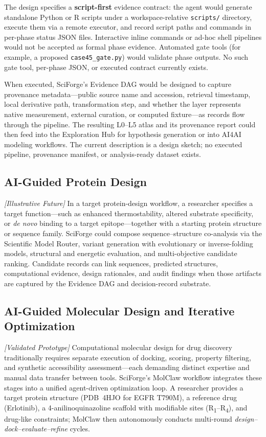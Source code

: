\documentclass[sn-basic,Numbered,pdflatex]{sn-jnl}
\begin{document}
The design specifies a \textbf{script-first} evidence contract: the agent would generate standalone Python or R scripts under a workspace-relative \texttt{scripts/} directory, execute them via a remote executor, and record script paths and commands in per-phase status JSON files. Interactive inline commands or ad-hoc shell pipelines would not be accepted as formal phase evidence. Automated gate tools (for example, a proposed \texttt{case45\_gate.py}) would validate phase outputs. No such gate tool, per-phase JSON, or executed contract currently exists.

When executed, SciForge's Evidence DAG would be designed to capture provenance metadata---public source name and accession, retrieval timestamp, local derivative path, transformation step, and whether the layer represents native measurement, external curation, or computed fixture---as records flow through the pipeline. The resulting L0--L5 atlas and its provenance report could then feed into the Exploration Hub for hypothesis generation or into AI4AI modeling workflows. The current description is a design sketch; no executed pipeline, provenance manifest, or analysis-ready dataset exists.

\FloatBarrier
\subsection{AI-Guided Protein Design}

\textit{[Illustrative Future]} In a target protein-design workflow, a researcher specifies a target function---such as enhanced thermostability, altered substrate specificity, or \emph{de novo} binding to a target epitope---together with a starting protein structure or sequence family. SciForge could compose sequence--structure co-analysis via the Scientific Model Router, variant generation with evolutionary or inverse-folding models, structural and energetic evaluation, and multi-objective candidate ranking. Candidate records can link sequences, predicted structures, computational evidence, design rationales, and audit findings when those artifacts are captured by the Evidence DAG and decision-record substrate.


\subsection{AI-Guided Molecular Design and Iterative Optimization}

\textit{[Validated Prototype]} Computational molecular design for drug discovery traditionally requires separate execution of docking, scoring, property filtering, and synthetic accessibility assessment---each demanding distinct expertise and manual data transfer between tools. SciForge's MolClaw workflow integrates these stages into a unified agent-driven optimization loop. A researcher provides a target protein structure (PDB~4HJO for EGFR T790M), a reference drug (Erlotinib), a 4-anilinoquinazoline scaffold with modifiable sites (R\textsubscript{1}--R\textsubscript{4}), and drug-like constraints; MolClaw then autonomously conducts multi-round \emph{design--dock--evaluate--refine} cycles.
\end{document}
